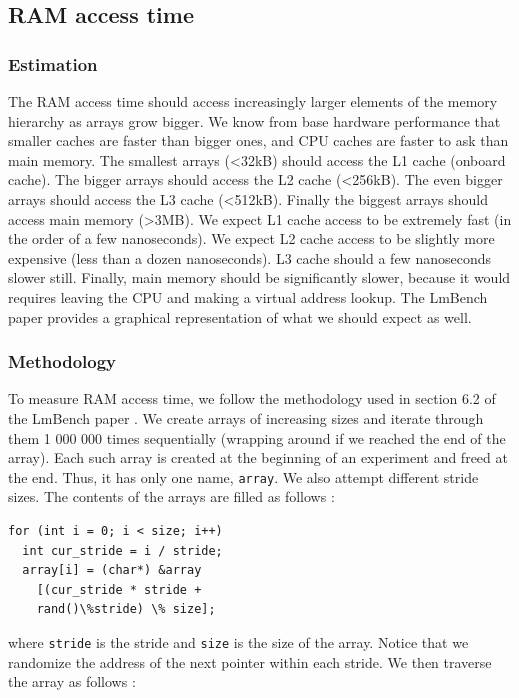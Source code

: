 \subsection{RAM access time}

\subsubsection{Estimation}

The RAM access time should access increasingly larger elements of the memory hierarchy as arrays grow bigger. We know from base hardware performance that smaller caches are faster than bigger ones, and CPU caches are faster to ask than main memory. The smallest arrays (<32kB) should access the L1 cache (onboard cache). The bigger arrays should access the L2 cache (<256kB). The even bigger arrays should access the L3 cache (<512kB). Finally the biggest arrays should access main memory (>3MB). We expect L1 cache access to be extremely fast (in the order of a few nanoseconds). We expect L2 cache access to be slightly more expensive  (less than a dozen nanoseconds). L3 cache should a few nanoseconds slower still. Finally, main memory should be significantly slower, because it would requires leaving the CPU and making a virtual address lookup. The LmBench paper provides a graphical representation of what we should expect as well.

\subsubsection{Methodology}

To measure RAM access time, we follow the methodology used in section 6.2 of the LmBench paper \cite{lmbench}. We create arrays of increasing sizes and iterate through them 1 000 000 times sequentially  (wrapping around if we reached the end of the array). Each such array is created at the beginning of an experiment and freed at the end. Thus, it has only one name, \texttt{array}. We also attempt different stride sizes. The contents of the arrays are filled as follows :

\begin{lstlisting}
for (int i = 0; i < size; i++)
  int cur_stride = i / stride;
  array[i] = (char*) &array
    [(cur_stride * stride +
    rand()\%stride) \% size];
\end{lstlisting}

where \texttt{stride} is the stride and \texttt{size} is the size of the array. Notice that we randomize the address of the next pointer within each stride.  We then traverse the array as follows :

